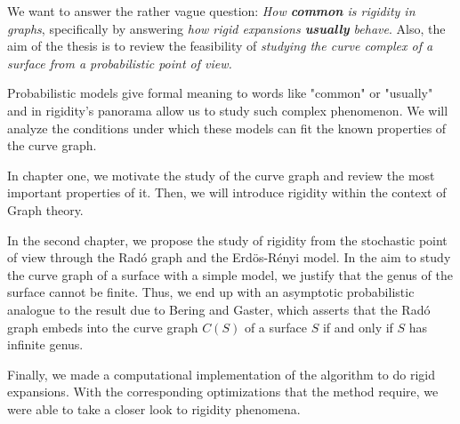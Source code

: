 We want to answer the rather vague question: \textit{How \textbf{common} is rigidity in graphs}, specifically by answering \textit{how rigid expansions \textbf{usually} behave}. Also, the aim of the thesis is to review the feasibility of \textit{studying the curve complex of a surface from a probabilistic point of view.}

Probabilistic models give formal meaning to words like "common" or "usually" and in rigidity's panorama allow us to study such complex phenomenon. We will analyze the conditions under which these models can fit the known properties of the curve graph.

In chapter one, we motivate the study of the curve graph and review the most important properties of it. Then, we will introduce rigidity within the context of Graph theory.

In the second chapter, we propose the study of rigidity from the stochastic point of view through the Radó graph and the Erdös-Rényi model. In the aim to study the curve graph of a surface with a simple model, we justify that the genus of the surface cannot be finite. Thus, we end up with an asymptotic probabilistic analogue to the result due to Bering and Gaster, which asserts that the Radó graph embeds into the curve graph $C(S)$ of a surface $S$ if and only if $S$ has infinite genus.

Finally, we made a computational implementation of the algorithm to do rigid expansions. With the corresponding optimizations that the method require, we were able to take a closer look to rigidity phenomena.